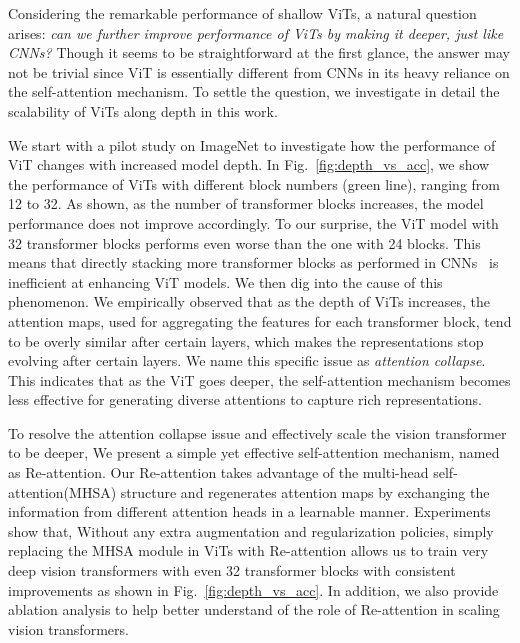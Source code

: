 \documentclass[10pt,twocolumn,letterpaper]{article}
\newcommand{\nameofatten}{Re-attention}
\begin{document}
Considering the remarkable    performance of shallow ViTs, a natural question arises: 
\emph{can we further improve performance of  ViTs by making it deeper, just like  CNNs?} Though it  seems to be  straightforward at the first glance, the answer may not be trivial since ViT is essentially different from CNNs in its heavy reliance on the self-attention mechanism. 
To settle the question, we  investigate in detail the scalability of ViTs along depth in this work.



We start with a pilot study on ImageNet to investigate how the performance of ViT changes with increased model depth. In Fig.~\ref{fig:depth_vs_acc}, we show the performance of ViTs \cite{dosovitskiy2020image}
with different block numbers (green line), ranging from 12 to 32.
As shown, as the number of transformer blocks increases, the model performance does not
improve accordingly. To our surprise, the ViT model with 32 transformer blocks performs even worse than the one with
24 blocks.
This means that directly stacking more transformer blocks as performed in CNNs~\cite{he2016deep}
is inefficient at enhancing ViT models.
We then dig into the cause of this phenomenon. We empirically observed that as the depth of ViTs increases,
the attention maps, used for aggregating the features for each transformer block,  tend to be overly similar after certain layers, which makes the representations stop evolving after certain layers. We name this specific issue as \emph{attention collapse}.
This indicates that as the ViT goes deeper, the self-attention mechanism becomes less effective for generating diverse attentions to capture rich representations. 



To resolve the attention collapse issue and effectively scale the vision transformer to be deeper, 
We present a simple yet effective self-attention mechanism, named as \nameofatten{}.
Our \nameofatten{} takes advantage of the multi-head self-attention(MHSA) structure and regenerates attention maps by exchanging the information from different attention heads in a learnable manner.
Experiments show that, Without any extra augmentation and regularization policies, 
simply replacing the MHSA module in ViTs with \nameofatten{} allows us to 
train very deep vision transformers with even 32 transformer blocks with consistent improvements
as shown in Fig.~\ref{fig:depth_vs_acc}.
In addition, we also provide ablation analysis to help better understand of the role
of \nameofatten{} in scaling vision transformers.
\end{document}
